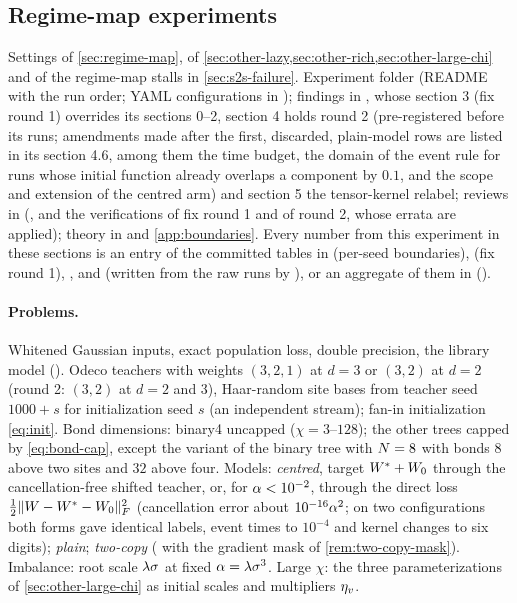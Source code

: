 \subsection{Regime-map experiments}\label{app:exp-regimes}
Settings of \cref{sec:regime-map}, of \cref{sec:other-lazy,sec:other-rich,sec:other-large-chi} and of the regime-map
stalls in \cref{sec:s2s-failure}.
Experiment folder  (README with the run order; YAML configurations in
); findings in , whose section 3 (fix round 1) overrides its sections
0--2, section 4 holds round 2 (pre-registered before its runs; amendments made after the first, discarded,
plain-model rows are listed in its section 4.6, among them the time budget, the domain of the event rule for runs
whose initial function already overlaps a component by $0.1$, and the scope and extension of the centred arm) and section 5 the
tensor-kernel relabel; reviews in
 (, and the verifications  of
fix round 1 and  of round 2, whose errata are applied); theory in
 and \cref{app:boundaries}. Every number from this experiment in these sections is
an entry of the committed tables in
 (per-seed boundaries),  (fix round 1), ,
 and  (written from the raw runs by ), or
an aggregate of them in  ().

\paragraph{Problems.}
Whitened Gaussian inputs, exact population loss, double precision, the library model
(). Odeco teachers with weights $(3,2,1)$ at $d=3$ or $(3,2)$ at $d=2$ (round 2: $(3,2)$
at $d=2$ and $3$), Haar-random
site bases from teacher seed $1000+s$ for initialization seed $s$ (an independent stream); fan-in initialization
\eqref{eq:init}. Bond dimensions: binary4 uncapped ($\chi=3$--$128$); the other trees capped by
\eqref{eq:bond-cap}, except the variant of the binary tree with $N=8$ with bonds $8$ above two sites and $32$
above four. Models: \emph{centred}, target $W^{*}+W_{0}$ through the cancellation-free shifted teacher, or, for
$\alpha<10^{-2}$, through the direct loss $\frac12\lVert W-W^{*}-W_{0}\rVert_{F}^2$ (cancellation error about
$10^{-16}\alpha^2$; on two configurations both forms gave identical labels, event times to $10^{-4}$ and kernel
changes to six digits); \emph{plain}; \emph{two-copy} ( with the gradient mask of
\cref{rem:two-copy-mask}). Imbalance: root scale $\lambda\sigma$ at fixed $\alpha=\lambda\sigma^3$. Large $\chi$: the
three parameterizations of \cref{sec:other-large-chi} as initial scales and multipliers $\eta_{v}$.

